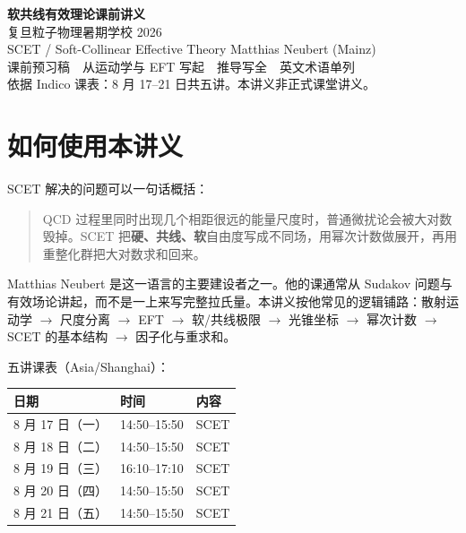 \documentclass[11pt,a4paper]{article}
\theoremstyle{definition}
\theoremstyle{plain}
\theoremstyle{remark}
\begin{document}
\begin{center}
{\LARGE\bfseries 软共线有效理论课前讲义}\\[0.45em]
{\large 复旦粒子物理暑期学校 2026}\\[0.25em]
{\large SCET / Soft-Collinear Effective Theory \quad Matthias Neubert (Mainz)}\\[0.8em]
{\normalsize 课前预习稿　从运动学与 EFT 写起　推导写全　英文术语单列}\\[0.35em]
{\small 依据 Indico 课表：8 月 17--21 日共五讲。本讲义非正式课堂讲义。}
\end{center}

\tableofcontents
\newpage

\section{如何使用本讲义}

SCET 解决的问题可以一句话概括：

\begin{quote}
QCD 过程里同时出现几个相距很远的能量尺度时，普通微扰论会被大对数毁掉。SCET 把\textbf{硬、共线、软}自由度写成不同场，用幂次计数做展开，再用重整化群把大对数求和回来。
\end{quote}

Matthias Neubert 是这一语言的主要建设者之一。他的课通常从 Sudakov 问题与有效场论讲起，而不是一上来写完整拉氏量。本讲义按他常见的逻辑铺路：散射运动学 $\to$ 尺度分离 $\to$ EFT $\to$ 软/共线极限 $\to$ 光锥坐标 $\to$ 幂次计数 $\to$ SCET 的基本结构 $\to$ 因子化与重求和。

五讲课表（Asia/Shanghai）：

\begin{center}
\begin{tabular}{lll}
\toprule
日期 & 时间 & 内容 \\
\midrule
8 月 17 日（一） & 14:50--15:50 & SCET \\
8 月 18 日（二） & 14:50--15:50 & SCET \\
8 月 19 日（三） & 16:10--17:10 & SCET \\
8 月 20 日（四） & 14:50--15:50 & SCET \\
8 月 21 日（五） & 14:50--15:50 & SCET \\
\bottomrule
\end{tabular}
\end{center}
\end{document}
